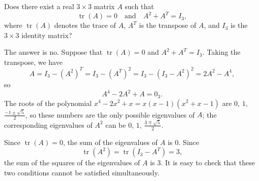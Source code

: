 \begin{problem}
    Does there exist a real \( 3 \times 3 \) matrix \( A \) such that
    \[
        \operatorname{tr}\left(A\right) = 0 \quad\text{and}\quad A^2 + A^T = I_3,
    \]
    where \( \operatorname{tr}\left(A\right) \) denotes the trace of \( A \), \( A^T \) is the transpose of \( A \), and \( I_3 \) is the \( 3 \times 3 \) identity matrix?
\end{problem}
\begin{solution}
    The answer is no. Suppose that \( \operatorname{tr}\left(A\right) = 0 \) and \( A^2 + A^T = I_3 \). Taking the transpose, we have
    \[
        A = I_3 - \left(A^2\right)^T = I_3 - \left(A^T\right)^2 = I_3 - \left(I_3 - A^2\right)^2 = 2A^2 - A^4,
    \]
    so
    \[
        A^4 - 2A^2 + A = 0_3 .
    \]
    The roots of the polynomial \( x^4 - 2x^2 + x = x\left(x-1\right)\left(x^2+x-1\right) \) are \( 0 \), \( 1 \), \( \frac{-1\pm\sqrt5}{2} \), so these numbers are the only possible eigenvalues of \( A \); the corresponding eigenvalues of \( A^2 \) can be \( 0 \), \( 1 \), \( \frac{3\mp\sqrt5}{2} \).

    Since \( \operatorname{tr}\left(A\right) = 0 \), the sum of the eigenvalues of \( A \) is \( 0 \). Since
    \[
        \operatorname{tr}\left(A^2\right) = \operatorname{tr}\left(I_3 - A^T\right) = 3,
    \]
    the sum of the squares of the eigenvalues of \( A \) is \( 3 \). It is easy to check that these two conditions cannot be satisfied simultaneously.
\end{solution}
